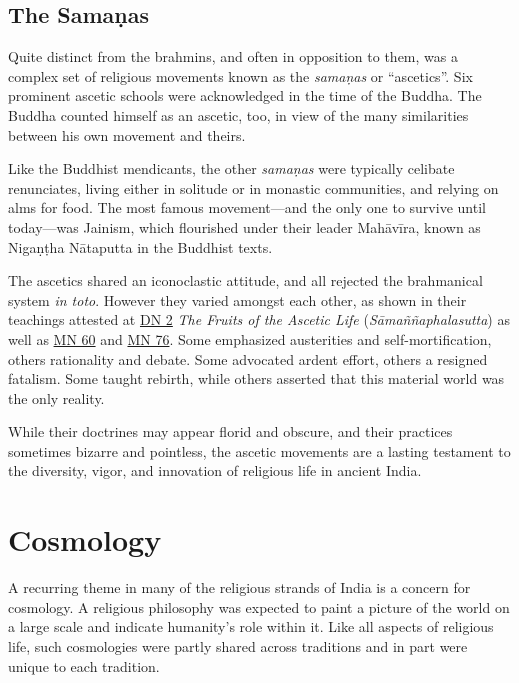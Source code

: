 \documentclass[12pt,openany]{book}%
\begin{document}
\subsection*{The \textsanskrit{Samaṇas}}

Quite distinct from the brahmins, and often in opposition to them, was a complex set of religious movements known as the \textit{\textsanskrit{samaṇas}} or “ascetics”. Six prominent ascetic schools were acknowledged in the time of the Buddha. The Buddha counted himself as an ascetic, too, in view of the many similarities between his own movement and theirs.

Like the Buddhist mendicants, the other \textit{\textsanskrit{samaṇas}} were typically celibate renunciates, living either in solitude or in monastic communities, and relying on alms for food. The most famous movement—and the only one to survive until today—was Jainism, which flourished under their leader \textsanskrit{Mahāvīra}, known as \textsanskrit{Nigaṇṭha} \textsanskrit{Nātaputta} in the Buddhist texts.

The ascetics shared an iconoclastic attitude, and all rejected the brahmanical system \textit{in toto}. However they varied amongst each other, as shown in their teachings attested at \href{https://suttacentral.net/dn2}{DN 2} \textit{The Fruits of the Ascetic Life} (\textit{\textsanskrit{Sāmaññaphalasutta}}) as well as \href{https://suttacentral.net/mn60}{MN 60} and \href{https://suttacentral.net/mn76}{MN 76}. Some emphasized austerities and self-mortification, others rationality and debate. Some advocated ardent effort, others a resigned fatalism. Some taught rebirth, while others asserted that this material world was the only reality.

While their doctrines may appear florid and obscure, and their practices sometimes bizarre and pointless, the ascetic movements are a lasting testament to the diversity, vigor, and innovation of religious life in ancient India.

\section*{Cosmology}

A recurring theme in many of the religious strands of India is a concern for cosmology. A religious philosophy was expected to paint a picture of the world on a large scale and indicate humanity’s role within it. Like all aspects of religious life, such cosmologies were partly shared across traditions and in part were unique to each tradition.
\end{document}
